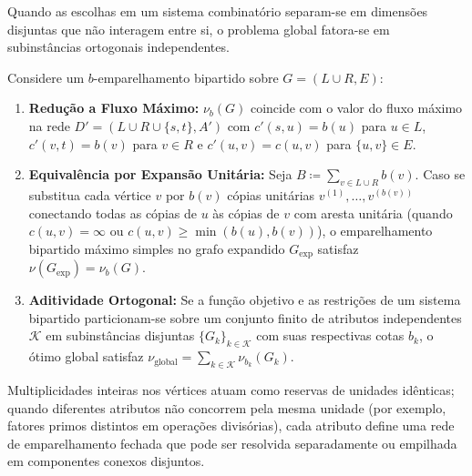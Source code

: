 Quando as escolhas em um sistema combinatório separam-se em dimensões disjuntas que não interagem entre si, o problema global fatora-se em subinstâncias ortogonais independentes.

\begin{teorema}
Considere um $b$-emparelhamento bipartido sobre $G = (L \cup R, E)$:
\begin{enumerate}
    \item \textbf{Redução a Fluxo Máximo:} $\nu_b(G)$ coincide com o valor do fluxo máximo na rede $D' = (L \cup R \cup \{s, t\}, A')$ com $c'(s, u) = b(u)$ para $u \in L$, $c'(v, t) = b(v)$ para $v \in R$ e $c'(u, v) = c(u, v)$ para $\{u, v\} \in E$.
    \item \textbf{Equivalência por Expansão Unitária:} Seja $B \coloneqq \sum_{v \in L \cup R} b(v)$. Caso se substitua cada vértice $v$ por $b(v)$ cópias unitárias $v^{(1)}, \dots, v^{(b(v))}$ conectando todas as cópias de $u$ às cópias de $v$ com aresta unitária (quando $c(u, v) = \infty$ ou $c(u, v) \ge \min(b(u), b(v))$), o emparelhamento bipartido máximo simples no grafo expandido $G_{\text{exp}}$ satisfaz $\nu(G_{\text{exp}}) = \nu_b(G)$.
    \item \textbf{Aditividade Ortogonal:} Se a função objetivo e as restrições de um sistema bipartido particionam-se sobre um conjunto finito de atributos independentes $\mathcal{K}$ em subinstâncias disjuntas $\{G_k\}_{k \in \mathcal{K}}$ com suas respectivas cotas $b_k$, o ótimo global satisfaz $\nu_{\text{global}} = \sum_{k \in \mathcal{K}} \nu_{b_k}(G_k)$.
\end{enumerate}
\end{teorema}

 Multiplicidades inteiras nos vértices atuam como reservas de unidades idênticas; quando diferentes atributos não concorrem pela mesma unidade (por exemplo, fatores primos distintos em operações divisórias), cada atributo define uma rede de emparelhamento fechada que pode ser resolvida separadamente ou empilhada em componentes conexos disjuntos.

